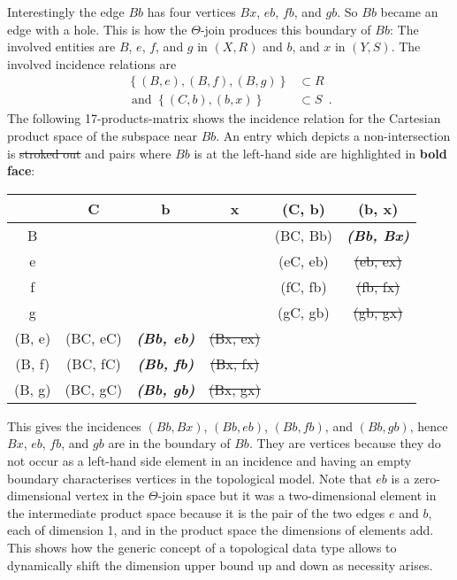 \documentclass[5p]{elsarticle}
\newcommand{\mathset}[1]{\left\{#1\right\}}
\begin{document}
Interestingly the edge $Bb$ has four vertices $Bx$, $eb$, $fb$, and $gb$. So $Bb$ 
became an edge with a hole. This is how the $\Theta$-join produces this boundary of $Bb$: 
The involved entities are $B$, $e$, $f$, and $g$ in $(X,R)$ and $b$, and $x$ in $(Y,S)$. 
The involved incidence relations are 
\begin{align*}
  \mathset{(B,e),(B,f),(B,g)}&\subset R \\
  \text{~and~}\mathset{(C,b),(b,x)}&\subset S\enspace.
\end{align*}
The following 17-products-matrix shows the incidence relation for the Cartesian product space of 
the subspace near $Bb$. An entry which depicts a non-intersection is \sout{stroked out} and 
pairs where $Bb$ is at the left-hand side are highlighted in \textbf{bold face}:
\begin{center}
\newcommand{\so}[1]{\sout{#1}}
\newcommand{\bi}[1]{\textbf{\textit{#1}}}
\it
\begin{tabular}{@{}c@{~}|@{~}c@{~}c@{~}c@{~}|@{~}c@{~}c@{}}
       &    C     &       b       &       x      &  (C, b)  &    (b, x)     \\\hline
 B     &          &               &              & (BC, Bb) & \bi{(Bb, Bx)} \\[\jot] 
 e     &          &               &              & (eC, eb) & \so{(eb, ex)} \\[\jot] 
 f     &          &               &              & (fC, fb) & \so{(fb, fx)} \\[\jot] 
 g     &          &               &              & (gC, gb) & \so{(gb, gx)} \\[\jot] \hline
(B, e) & (BC, eC) & \bi{(Bb, eb)} & \so{(Bx, ex)} \\[\jot] 
(B, f) & (BC, fC) & \bi{(Bb, fb)} & \so{(Bx, fx)} \\[\jot] 
(B, g) & (BC, gC) & \bi{(Bb, gb)} & \so{(Bx, gx)} 
\end{tabular}
\end{center}
This gives the incidences $(Bb,Bx)$, $(Bb,eb)$, $(Bb,fb)$, and $(Bb,gb)$, 
hence $Bx$, $eb$, $fb$, and $gb$ are in the boundary of $Bb$. They are 
vertices because they do not occur as a left-hand side element in an incidence and 
having an empty boundary characterises vertices in the topological model. 
Note that $eb$ is a zero-dimensional vertex in the $\Theta$-join space 
but it was a two-dimensional element in the intermediate product space because it is the pair  
of the two edges $e$ and $b$, each of dimension 1, and in the product space the dimensions of 
elements add. 
This shows how the generic concept of a topological data type allows to dynamically shift the 
dimension upper bound up and down as necessity arises. 
\end{document}

